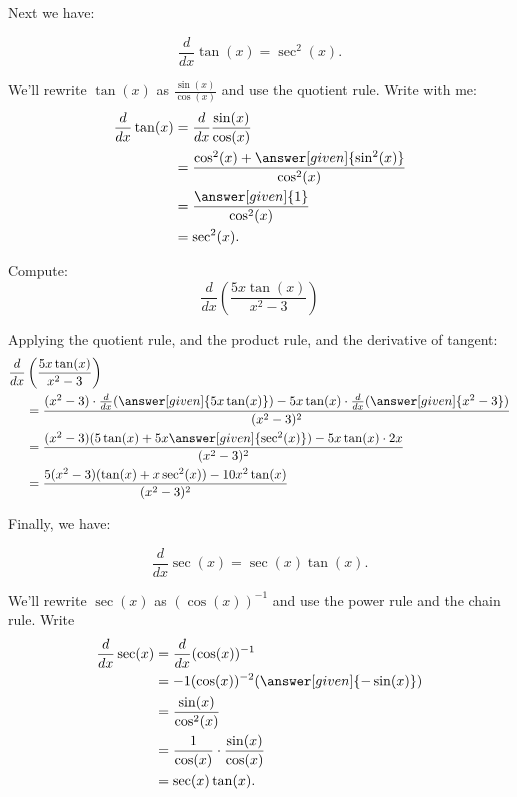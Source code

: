 \documentclass{ximera}
\begin{document}
Next we have:

\begin{theorem}
\[
\frac{d}{dx} \tan(x) = \sec^2(x).
\]

\begin{explanation}
We'll rewrite $\tan(x)$ as $\frac{\sin(x)}{\cos(x)}$ and use the
quotient rule. Write with me:
\begin{align*}
\frac{d}{dx}\tan(x) &= \frac{d}{dx}\frac{\sin(x)}{\cos(x)}\\
&=\frac{\cos^2(x) + \answer[given]{\sin^2(x)}}{\cos^2(x)}\\
&=\frac{\answer[given]{1}}{\cos^2(x)}\\
&=\sec^2(x).
\end{align*}
\end{explanation}
\end{theorem}

\begin{example}
Compute:
\[
\frac{d}{dx} \left( \frac{5x \tan(x)}{x^2 - 3} \right)
\]
\begin{explanation}
Applying the quotient rule, and the product rule, and the derivative
of tangent:
\begin{align*}
  \frac{d}{dx} &\left( \frac{5x \tan(x)}{x^2 - 3} \right) \\
  &= \frac{(x^2 - 3) \cdot \frac{d}{dx}(\answer[given]{5x \tan(x)}) - 5x \tan(x) \cdot \frac{d}{dx} (\answer[given]{x^2 - 3})}{(x^2 - 3)^2}  \\
  &= \frac{(x^2 - 3)(5 \tan(x) + 5x \answer[given]{\sec^2(x)}) - 5x \tan(x) \cdot 2x}{(x^2 - 3)^2}  \\
  &= \frac{5(x^2-3)(\tan(x)+x \sec^2(x)) - 10x^2 \tan(x)}{(x^2-3)^2}
\end{align*}
\end{explanation}
\end{example}

Finally, we have:

\begin{theorem}
\[
\frac{d}{dx} \sec(x) = \sec(x)\tan(x).
\]


\begin{explanation}
We'll rewrite $\sec(x)$ as $(\cos(x))^{-1}$ and use the power rule and the chain rule. Write
\begin{align*}
\frac{d}{dx} \sec(x) &= \frac{d}{dx}(\cos (x))^{-1}\\
&=-1(\cos(x))^{-2}(\answer[given]{-\sin(x)}) \\
&= \frac{\sin(x)}{\cos^2(x)} \\
&= \frac{1}{\cos(x)} \cdot \frac{\sin(x)}{\cos(x)}  \\
&= \sec(x)\tan(x).
\end{align*}
\end{explanation}
\end{theorem}
\end{document}
